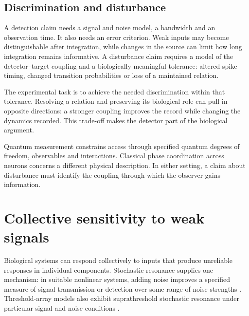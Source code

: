 \documentclass[10pt,twocolumn]{article}
\begin{document}
\subsection{Discrimination and disturbance}

A detection claim needs a signal and noise model, a bandwidth and an observation time. It also needs an error criterion. Weak inputs may become distinguishable after integration, while changes in the source can limit how long integration remains informative. A disturbance claim requires a model of the detector--target coupling and a biologically meaningful tolerance: altered spike timing, changed transition probabilities or loss of a maintained relation.

The experimental task is to achieve the needed discrimination within that tolerance. Resolving a relation and preserving its biological role can pull in opposite directions: a stronger coupling improves the record while changing the dynamics recorded. This trade-off makes the detector part of the biological argument.

Quantum measurement constrains access through specified quantum degrees of freedom, observables and interactions. Classical phase coordination across neurons concerns a different physical description. In either setting, a claim about disturbance must identify the coupling through which the observer gains information.

\section{Collective sensitivity to weak signals}

Biological systems can respond collectively to inputs that produce unreliable responses in individual components. Stochastic resonance supplies one mechanism: in suitable nonlinear systems, adding noise improves a specified measure of signal transmission or detection over some range of noise strengths \citep{gammaitoni1998,mcdonnell2011}. Threshold-array models also exhibit suprathreshold stochastic resonance under particular signal and noise conditions \citep{stocks2000}.
\end{document}
